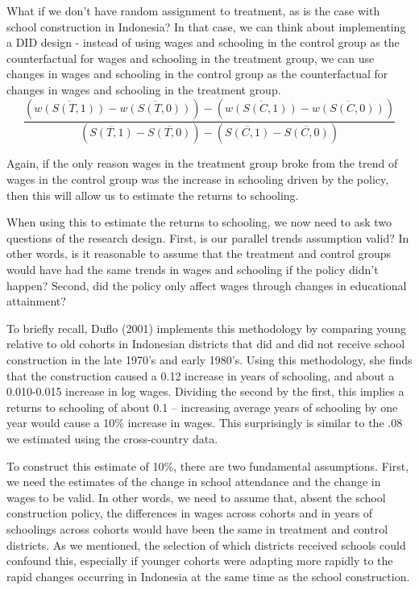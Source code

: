 \documentclass[12pt,english]{article}
\begin{document}
What if we don't have random assignment to treatment, as is the case with school construction in Indonesia? In that case, we can think about implementing a DID design - instead of using wages and schooling in the control group as the counterfactual for wages and schooling in the treatment group, we can use changes in wages and schooling in the control group as the counterfactual for changes in wages and schooling in the treatment group.
$$ \frac{\left(\overline{w(S(T,1))} - \overline{w(S(T,0))}\right) - \left(\overline{w(S(C,1))} - \overline{w(S(C,0))}\right)}{\left(\overline{S(T,1)} - \overline{S(T,0)}\right) - \left(\overline{S(C,1)} - \overline{S(C,0)}\right)} $$

Again, if the only reason wages in the treatment group broke from the trend of wages in the control group was the increase in schooling driven by the policy, then this will allow us to estimate the returns to schooling.

When using this to estimate the returns to schooling, we now need to ask two questions of the research design. First, is our parallel trends assumption valid? In other words, is it reasonable to assume that the treatment and control groups would have had the same trends in wages and schooling if the policy didn't happen? Second, did the policy only affect wages through changes in educational attainment?

To briefly recall, Duflo (2001) implements this methodology by comparing young relative to old cohorts in Indonesian districts that did and did not receive school construction in the late 1970's and early 1980's. Using this methodology, she finds that the construction caused a 0.12 increase in years of schooling, and about a 0.010-0.015 increase in log wages. Dividing the second by the first, this implies a returns to schooling of about 0.1 -- increasing average years of schooling by one year would cause a 10\% increase in wages. This surprisingly is similar to the .08 we estimated using the cross-country data.

To construct this estimate of 10\%, there are two fundamental assumptions. First, we need the estimates of the change in school attendance and the change in wages to be valid. In other words, we need to assume that, absent the school construction policy, the differences in wages across cohorts and in years of schoolings across cohorts would have been the same in treatment and control districts. As we mentioned, the selection of which districts received schools could confound this, especially if younger cohorts were adapting more rapidly to the rapid changes occurring in Indonesia at the same time as the school construction.
\end{document}

